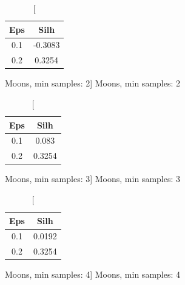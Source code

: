 \documentclass{classrep}
\begin{document}
{{{                \begin{table}[!htbp]
                    \begin{minipage}{.24\textwidth}
                        \centering
                        \begin{tabular}{|c|c|}
                            \hline
                            Eps & Silh \\ \hline
                            0.1 & -0.3083 \\ \hline
                            0.2 & 0.3254 \\ \hline
                        \end{tabular}
                        \caption
                        [Moons, min samples: 2]
                        {Moons, min samples: 2}
                        \label{db_scan_table_Moons_manh_min_sample2}
                    \end{minipage}
                    \hfill
                    \begin{minipage}{.24\textwidth}
                        \centering
                        \begin{tabular}{|c|c|}
                            \hline
                            Eps & Silh \\ \hline
                            0.1 & 0.083 \\ \hline
                            0.2 & 0.3254 \\ \hline
                        \end{tabular}
                        \caption
                        [Moons, min samples: 3]
                        {Moons, min samples: 3}
                        \label{db_scan_table_Moons_manh_min_sample3}
                    \end{minipage}
                    \hfill
                    \begin{minipage}{.24\textwidth}
                        \centering
                        \begin{tabular}{|c|c|}
                            \hline
                            Eps & Silh \\ \hline
                            0.1 & 0.0192 \\ \hline
                            0.2 & 0.3254 \\ \hline
                        \end{tabular}
                        \caption
                        [Moons, min samples: 4]
                        {Moons, min samples: 4}

\end{minipage}
\end{table}}}}
\end{document}
